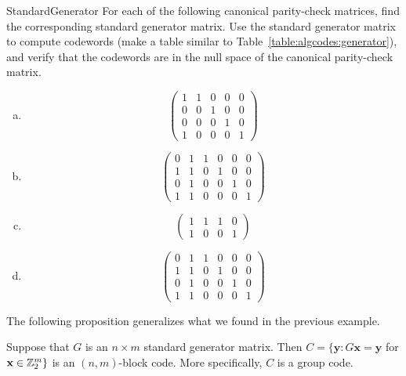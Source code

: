 \begin{exercise}{StandardGenerator}
For each of the following canonical parity-check matrices, find the corresponding standard generator matrix. Use the standard generator matrix to compute codewords (make a table similar to Table~\ref{table:algcodes:generator}), and verify that the codewords are in the null space of the canonical parity-check matrix.
 
\begin{enumerate}[(a)]
 \item
\[
\left(
\begin{array}{ccccc}
1 & 1 & 0 & 0 & 0 \\
0 & 0 & 1 & 0 & 0 \\
0 & 0 & 0 & 1 & 0 \\
1 & 0 & 0 & 0 & 1
\end{array}
\right)
\]

\item
\[
\left(
\begin{array}{cccccc}
0 & 1 & 1 & 0 & 0 & 0 \\
1 & 1 & 0 & 1 & 0 & 0 \\
0 & 1 & 0 & 0 & 1 & 0 \\
1 & 1 & 0 & 0 & 0 & 1
\end{array}
\right)
\]

 \item
\[
\left(
\begin{array}{cccc}
1 & 1 & 1 & 0 \\
1 & 0 & 0 & 1
\end{array}
\right)
\]

 \item
\[
\left(
\begin{array}{cccccc}
0 & 1 & 1 & 0 & 0 & 0 \\
1 & 1 & 0 & 1 & 0 & 0 \\
0 & 1 & 0 & 0 & 1 & 0 \\
1 & 1 & 0 & 0 & 0 & 1
\end{array}
\right)
\]
\end{enumerate}
\end{exercise}

 The following proposition  generalizes what we found in the previous example.
 
 \begin{prop}{}
Suppose that $G$ is an $n \times m$  standard generator matrix.  Then
$C = \{ \textbf{y} : G \textbf{x} =\textbf{y}$  for $\textbf{x} \in
{\Bbb  Z}_2^m \}$ is an  $(n,m)$-block code. More specifically, $C$
is a group code.  
\end{prop}
 
